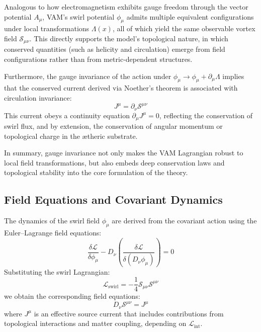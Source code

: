         Analogous to how electromagnetism exhibits gauge freedom through the vector potential $A_\mu$, VAM's swirl potential $\phi_\mu$ admits multiple equivalent configurations under local transformations $\Lambda(x)$, all of which yield the same observable vortex field $\mathcal{S}_{\mu\nu}$. This directly supports the model's topological nature, in which conserved quantities (such as helicity and circulation) emerge from field configurations rather than from metric-dependent structures.

        Furthermore, the gauge invariance of the action under $\phi_\mu \rightarrow \phi_\mu + \partial_\mu \Lambda$ implies that the conserved current derived via Noether's theorem is associated with circulation invariance:
        \begin{equation}
            J^\mu = \partial_\nu \mathcal{S}^{\mu\nu}
        \end{equation}
        This current obeys a continuity equation $\partial_\mu J^\mu = 0$, reflecting the conservation of swirl flux, and by extension, the conservation of angular momentum or topological charge in the ætheric substrate.

        In summary, gauge invariance not only makes the VAM Lagrangian robust to local field transformations, but also embeds deep conservation laws and topological stability into the core formulation of the theory.


        \subsection{Field Equations and Covariant Dynamics}
        The dynamics of the swirl field $\phi_\mu$ are derived from the covariant action using the Euler–Lagrange field equations:
        \begin{equation}
            \frac{\delta \mathcal{L}}{\delta \phi_\mu} - D_\nu \left( \frac{\delta \mathcal{L}}{\delta (D_\nu \phi_\mu)} \right) = 0
        \end{equation}
        Substituting the swirl Lagrangian:
        \begin{equation}
            \mathcal{L}_{\text{swirl}} = -\frac{1}{4} \mathcal{S}_{\mu\nu} \mathcal{S}^{\mu\nu}
        \end{equation}
        we obtain the corresponding field equations:
        \begin{equation}
            D_\nu \mathcal{S}^{\mu\nu} = J^\mu
        \end{equation}
        where $J^\mu$ is an effective source current that includes contributions from topological interactions and matter coupling, depending on $\mathcal{L}_{\text{int}}$.


